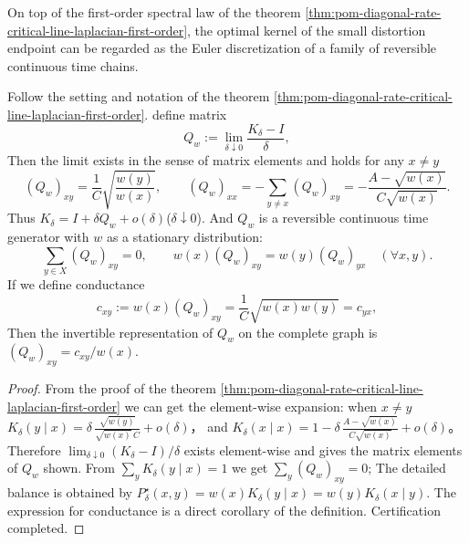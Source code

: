 On top of the first-order spectral law of the theorem \ref{thm:pom-diagonal-rate-critical-line-laplacian-first-order}, the optimal kernel of the small distortion endpoint can be regarded as the Euler discretization of a family of reversible continuous time chains.

\begin{corollary}\label{cor:pom-diagonal-rate-critical-continuous-time-generator}
Follow the setting and notation of the theorem \ref{thm:pom-diagonal-rate-critical-line-laplacian-first-order}.
define matrix
\[
Q_w:=\lim_{\delta\downarrow 0}\frac{K_\delta-I}{\delta},
\]
Then the limit exists in the sense of matrix elements and holds for any \(x\ne y\)
\[
(Q_w)_{xy}=\frac{1}{C}\sqrt{\frac{w(y)}{w(x)}},
\qquad
(Q_w)_{xx}=-\sum_{y\ne x}(Q_w)_{xy}
=-\frac{A-\sqrt{w(x)}}{C\sqrt{w(x)}}.
\]
Thus \(K_\delta=I+\delta Q_w+o(\delta)\)(\(\delta\downarrow 0\)).
And \(Q_w\) is a reversible continuous time generator with \(w\) as a stationary distribution:
\[
\sum_{y\in X}(Q_w)_{xy}=0,\qquad
w(x)(Q_w)_{xy}=w(y)(Q_w)_{yx}\quad(\forall x,y).
\]
If we define conductance
\[
c_{xy}:=w(x)(Q_w)_{xy}=\frac{1}{C}\sqrt{w(x)w(y)}=c_{yx},
\]
Then the invertible representation of \(Q_w\) on the complete graph is \((Q_w)_{xy}=c_{xy}/w(x)\).
\end{corollary}
\begin{proof}
From the proof of the theorem \ref{thm:pom-diagonal-rate-critical-line-laplacian-first-order} we can get the element-wise expansion:
when \(x\ne y\)
\(
K_\delta(y\mid x)=\delta\,\frac{\sqrt{w(y)}}{\sqrt{w(x)}\,C}+o(\delta)
\)，
and
\(
K_\delta(x\mid x)=1-\delta\,\frac{A-\sqrt{w(x)}}{C\sqrt{w(x)}}+o(\delta)
\)。
Therefore \(\lim_{\delta\downarrow 0}(K_\delta-I)/\delta\) exists element-wise and gives the matrix elements of \(Q_w\) shown.
From \(\sum_y K_\delta(y\mid x)=1\) we get \(\sum_y (Q_w)_{xy}=0\);
The detailed balance is obtained by \(P^\star_\delta(x,y)=w(x)K_\delta(y\mid x)=w(y)K_\delta(x\mid y)\).
The expression for conductance is a direct corollary of the definition. Certification completed.
\end{proof}


